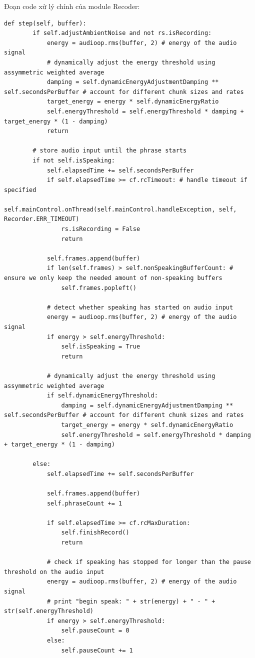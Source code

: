 \begin{itemize}
Đoạn code xử lý chính của module Recoder:
\begin{lstlisting}
def step(self, buffer):
        if self.adjustAmbientNoise and not rs.isRecording:
            energy = audioop.rms(buffer, 2) # energy of the audio signal
            # dynamically adjust the energy threshold using assymmetric weighted average
            damping = self.dynamicEnergyAdjustmentDamping ** self.secondsPerBuffer # account for different chunk sizes and rates
            target_energy = energy * self.dynamicEnergyRatio
            self.energyThreshold = self.energyThreshold * damping + target_energy * (1 - damping)
            return

        # store audio input until the phrase starts
        if not self.isSpeaking:
            self.elapsedTime += self.secondsPerBuffer
            if self.elapsedTime >= cf.rcTimeout: # handle timeout if specified
                self.mainControl.onThread(self.mainControl.handleException, self, Recorder.ERR_TIMEOUT)
                rs.isRecording = False
                return

            self.frames.append(buffer)
            if len(self.frames) > self.nonSpeakingBufferCount: # ensure we only keep the needed amount of non-speaking buffers
                self.frames.popleft()

            # detect whether speaking has started on audio input
            energy = audioop.rms(buffer, 2) # energy of the audio signal
            if energy > self.energyThreshold:
                self.isSpeaking = True
                return

            # dynamically adjust the energy threshold using assymmetric weighted average
            if self.dynamicEnergyThreshold:
                damping = self.dynamicEnergyAdjustmentDamping ** self.secondsPerBuffer # account for different chunk sizes and rates
                target_energy = energy * self.dynamicEnergyRatio
                self.energyThreshold = self.energyThreshold * damping + target_energy * (1 - damping)

        else:
            self.elapsedTime += self.secondsPerBuffer

            self.frames.append(buffer)
            self.phraseCount += 1

            if self.elapsedTime >= cf.rcMaxDuration:
                self.finishRecord()
                return

            # check if speaking has stopped for longer than the pause threshold on the audio input
            energy = audioop.rms(buffer, 2) # energy of the audio signal
            # print "begin speak: " + str(energy) + " - " + str(self.energyThreshold)
            if energy > self.energyThreshold:
                self.pauseCount = 0
            else:
                self.pauseCount += 1


\end{lstlisting}
\end{itemize}
